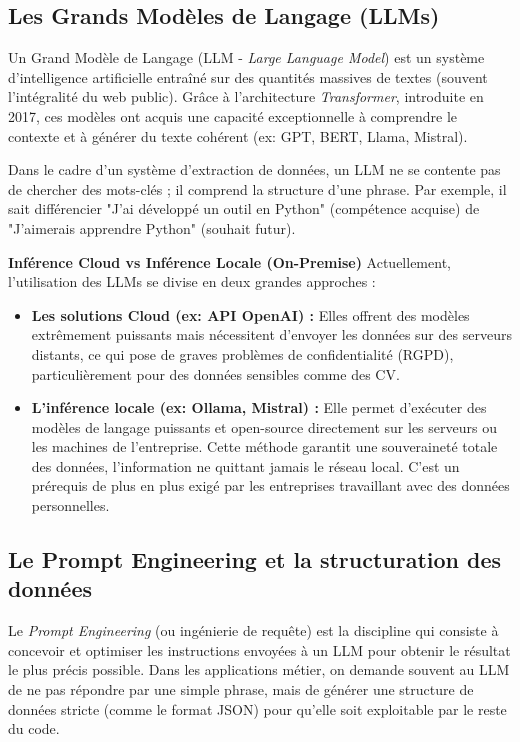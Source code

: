 \subsection{Les Grands Modèles de Langage (LLMs)}
Un Grand Modèle de Langage (LLM - \textit{Large Language Model}) est un système d'intelligence artificielle entraîné sur des quantités massives de textes (souvent l'intégralité du web public). Grâce à l'architecture \textit{Transformer}, introduite en 2017, ces modèles ont acquis une capacité exceptionnelle à comprendre le contexte et à générer du texte cohérent (ex: GPT, BERT, Llama, Mistral).

Dans le cadre d'un système d'extraction de données, un LLM ne se contente pas de chercher des mots-clés ; il comprend la structure d'une phrase. Par exemple, il sait différencier "J'ai développé un outil en Python" (compétence acquise) de "J'aimerais apprendre Python" (souhait futur).

\textbf{Inférence Cloud vs Inférence Locale (On-Premise)}
Actuellement, l'utilisation des LLMs se divise en deux grandes approches :
\begin{itemize}
    \item \textbf{Les solutions Cloud (ex: API OpenAI) :} Elles offrent des modèles extrêmement puissants mais nécessitent d'envoyer les données sur des serveurs distants, ce qui pose de graves problèmes de confidentialité (RGPD), particulièrement pour des données sensibles comme des CV.
    \item \textbf{L'inférence locale (ex: Ollama, Mistral) :} Elle permet d'exécuter des modèles de langage puissants et open-source directement sur les serveurs ou les machines de l'entreprise. Cette méthode garantit une souveraineté totale des données, l'information ne quittant jamais le réseau local. C'est un prérequis de plus en plus exigé par les entreprises travaillant avec des données personnelles.
\end{itemize}

\subsection{Le Prompt Engineering et la structuration des données}
Le \textit{Prompt Engineering} (ou ingénierie de requête) est la discipline qui consiste à concevoir et optimiser les instructions envoyées à un LLM pour obtenir le résultat le plus précis possible. Dans les applications métier, on demande souvent au LLM de ne pas répondre par une simple phrase, mais de générer une structure de données stricte (comme le format JSON) pour qu'elle soit exploitable par le reste du code. 

